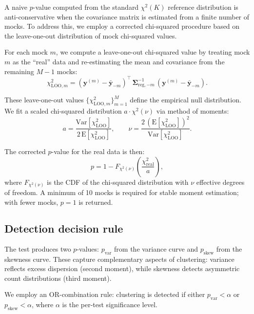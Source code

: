 \documentclass[11pt]{article}
\begin{document}
A naive $p$-value computed from the standard $\chi^2(K)$ reference
distribution is anti-conservative when the covariance matrix is estimated
from a finite number of mocks. To address this, we employ a corrected
chi-squared procedure based on the leave-one-out distribution of mock
chi-squared values.

For each mock $m$, we compute a leave-one-out chi-squared value by
treating mock $m$ as the ``real'' data and re-estimating the mean and
covariance from the remaining $M-1$ mocks:
\begin{equation}
  \chi^2_{\mathrm{LOO},m} =
    (\mathbf{y}^{(m)} - \bar{\mathbf{y}}_{-m})^\top\,
    \boldsymbol{\Sigma}_{\mathrm{reg},-m}^{-1}\,
    (\mathbf{y}^{(m)} - \bar{\mathbf{y}}_{-m}).
  \label{eq:loo}
\end{equation}

These leave-one-out values $\{\chi^2_{\mathrm{LOO},m}\}_{m=1}^{M}$
define the empirical null distribution. We fit a scaled chi-squared
distribution $a \cdot \chi^2(\nu)$ via method of moments:
\begin{equation}
  a = \frac{\mathrm{Var}[\chi^2_\mathrm{LOO}]}{2\,\mathrm{E}[\chi^2_\mathrm{LOO}]},
  \qquad
  \nu = \frac{2\,(\mathrm{E}[\chi^2_\mathrm{LOO}])^2}
             {\mathrm{Var}[\chi^2_\mathrm{LOO}]}.
  \label{eq:moments}
\end{equation}

The corrected $p$-value for the real data is then:
\begin{equation}
  p = 1 - F_{\chi^2(\nu)}\!\left(\frac{\chi^2_\mathrm{real}}{a}\right),
  \label{eq:pvalue}
\end{equation}
where $F_{\chi^2(\nu)}$ is the CDF of the chi-squared distribution with
$\nu$ effective degrees of freedom. A minimum of 10 mocks is required for
stable moment estimation; with fewer mocks, $p = 1$ is returned.

\subsection{Detection decision rule}
\label{sec:detection-rule}

The test produces two $p$-values: $p_\mathrm{var}$ from the variance
curve and $p_\mathrm{skew}$ from the skewness curve. These capture
complementary aspects of clustering: variance reflects excess dispersion
(second moment), while skewness detects asymmetric count distributions
(third moment).

We employ an OR-combination rule: clustering is detected if either
$p_\mathrm{var} < \alpha$ or $p_\mathrm{skew} < \alpha$, where $\alpha$
is the per-test significance level.
\end{document}

